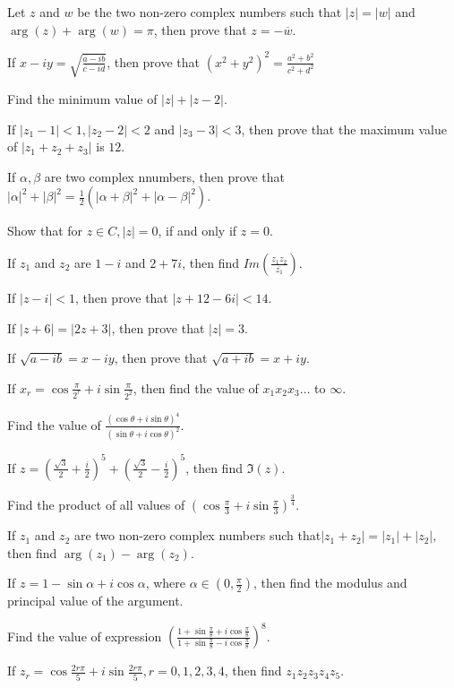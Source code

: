 \item Let $z$ and $w$ be the two non-zero complex numbers such that $|z| = |w|$ and $\arg(z) + \arg(w) = \pi$, then prove that $z =
  -\overline{w}$.
\item If $x - iy = \sqrt{\frac{a - ib}{c - id}}$, then prove that $(x^2 + y^2)^2 = \frac{a^2 + b^2}{c^2 + d^2}$
\item Find the minimum value of $|z| + |z - 2|$.
\item If $|z_1 - 1|< 1, |z_2 - 2| < 2$ and $|z_3 - 3|< 3$, then prove that the maximum value of $|z_1 + z_2 + z_3|$ is $12$.
\item If $\alpha, \beta$ are two complex nnumbers, then prove that $|\alpha|^2 + |\beta|^2 = \frac{1}{2}(|\alpha + \beta|^2 +
  |\alpha - \beta|^2)$.
\item Show that for $z\in C, |z| = 0$, if and only if $z = 0$.
\item If $z_1$ and $z_2$ are $1 - i$ and $2 + 7i$, then find $Im\left(\frac{z_1z_2}{\overline{z_1}}\right)$.
\item If $|z - i|< 1$, then prove that $|z + 12 - 6i| < 14$.
\item If $|z + 6| = |2z + 3|$, then prove that $|z| = 3$.
\item If $\sqrt{a - ib} = x -iy$, then prove that $\sqrt{a + ib} = x + iy$.
\item If $x_r = \cos\frac{\pi}{2^r} + i\sin\frac{\pi}{2^2}$, then find the value of $x_1x_2x_3\ldots$ to $\infty$.
\item Find the value of $\frac{(\cos\theta + i\sin\theta)^4}{(\sin\theta + i\cos\theta)^2}$.
\item If $z = \left(\frac{\sqrt{3}}{2} + \frac{i}{2}\right)^5 + \left(\frac{\sqrt{3}}{2} - \frac{i}{2}\right)^5$, then find
  $\Im(z)$.
\item Find the product of all values of $\left(\cos\frac{\pi}{3} + i\sin\frac{\pi}{3}\right)^{\frac{3}{4}}$.
\item If $z_1$ and $z_2$ are two non-zero complex numbers such that$|z_1 + z_2| = |z_1| + |z_2|$, then find $\arg(z_1) - \arg(z_2)$.
\item If $z = 1 - \sin\alpha + i\cos\alpha$, where $\alpha \in \left(0, \frac{\pi}{2}\right)$, then find the modulus and principal
  value of the argument.
\item Find the value of expression $\left(\frac{1 + \sin\frac{\pi}{8} + i\cos\frac{\pi}{8}}{1 + \sin\frac{\pi}{8} -
  i\cos\frac{\pi}{8}}\right)^8$.
\item If $z_r = \cos\frac{2r\pi}{5} + i\sin\frac{2r\pi}{5}, r = 0, 1, 2, 3, 4$, then find $z_1z_2z_3z_4z_5$.

